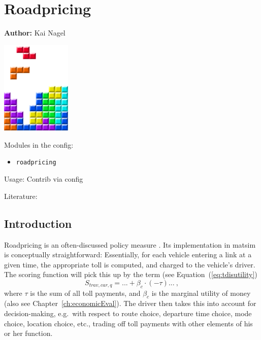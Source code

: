 \chapter{Roadpricing }
\label{ch:roadpricing}

\hfill \textbf{Author:} Kai Nagel

\begin{center} \includegraphics[width=0.25\textwidth, angle=0]{figures/MATSimBook.png} \end{center}

Modules in the config: 
\begin{itemize}
	\item \lstinline|roadpricing|
\end{itemize}

Usage: Contrib via config 

Literature: \citet[][]{RieserEtAl_TechRep_VSP_2007, Rieser_unpub_IVT_2008, GretherEtAl_ERSA_2008, RieserEtAl_TRBTDF_2008} 


\section{Introduction}

Roadpricing is an often-discussed policy measure \citep[e.g.][]{...}.  Its implementation in \acrshort{matsim} is conceptually straightforward: Essentially, for each vehicle entering a link at a given time, the appropriate toll is computed, and charged to the vehicle's driver.  The scoring function will pick this up by the term (see Equation~(\ref{eq:tdisutility})
\[
S_{trav,car,q} = ... + \beta_{c} \cdot (- \tau) ... \ ,
\]
where $\tau$ is the sum of all toll payments, and $\beta_{c}$ is the marginal utility of money (also see Chapter~\ref{ch:economicEval}).  The driver then takes this into account for decision-making, e.g.\ with respect to route choice, departure time choice, mode choice, location choice, etc., trading off toll payments with other elements of his or her function.


